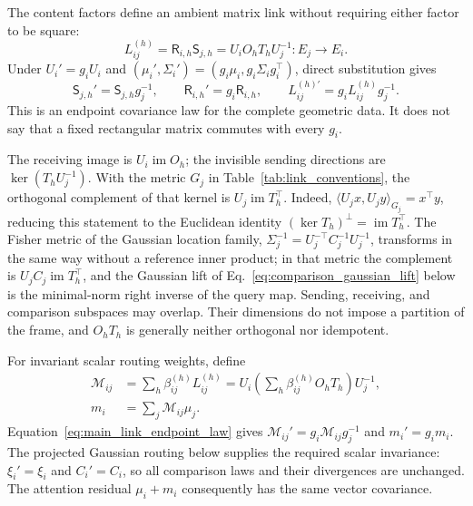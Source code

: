 \documentclass[twoside,11pt]{article}
\begin{document}
The content factors define an ambient matrix link without requiring either factor to be square:
\begin{equation}
L_{ij}^{(h)}=\mathsf R_{i,h}\mathsf S_{j,h}
=U_iO_hT_hU_j^{-1}:E_j\longrightarrow E_i.
\label{eq:main_content_link}
\end{equation}
Under $U_i'=g_iU_i$ and $(\mu_i',\Sigma_i')=(g_i\mu_i,g_i\Sigma_i g_i^\top)$, direct substitution gives
\begin{equation}
\mathsf S_{j,h}'=\mathsf S_{j,h}g_j^{-1},\qquad
\mathsf R_{i,h}'=g_i\mathsf R_{i,h},\qquad
L_{ij}^{(h)\prime}=g_iL_{ij}^{(h)}g_j^{-1}.
\label{eq:main_link_endpoint_law}
\end{equation}
This is an endpoint covariance law for the complete geometric data. It does not say that a fixed rectangular matrix commutes with every $g_i$.

The receiving image is $U_i\operatorname{im}O_h$; the invisible sending directions are $\ker(T_hU_j^{-1})$. With the metric $G_j$ in Table~\ref{tab:link_conventions}, the orthogonal complement of that kernel is $U_j\operatorname{im}T_h^\top$. Indeed, $\langle U_jx,U_jy\rangle_{G_j}=x^\top y$, reducing this statement to the Euclidean identity $(\ker T_h)^\perp=\operatorname{im}T_h^\top$. The Fisher metric of the Gaussian location family, $\Sigma_j^{-1}=U_j^{-\top}C_j^{-1}U_j^{-1}$, transforms in the same way without a reference inner product; in that metric the complement is $U_jC_j\operatorname{im}T_h^\top$, and the Gaussian lift of Eq.~\eqref{eq:comparison_gaussian_lift} below is the minimal-norm right inverse of the query map. Sending, receiving, and comparison subspaces may overlap. Their dimensions do not impose a partition of the frame, and $O_hT_h$ is generally neither orthogonal nor idempotent.

For invariant scalar routing weights, define
\begin{align}
\mathcal M_{ij}&=\sum_h\beta_{ij}^{(h)}L_{ij}^{(h)}
=U_i\left(\sum_h\beta_{ij}^{(h)}O_hT_h\right)U_j^{-1},\\
m_i&=\sum_j\mathcal M_{ij}\mu_j.
\label{eq:main_routed_link}
\end{align}
Equation~\eqref{eq:main_link_endpoint_law} gives $\mathcal M_{ij}'=g_i\mathcal M_{ij}g_j^{-1}$ and $m_i'=g_im_i$. The projected Gaussian routing below supplies the required scalar invariance: $\xi_i'=\xi_i$ and $C_i'=C_i$, so all comparison laws and their divergences are unchanged. The attention residual $\mu_i+m_i$ consequently has the same vector covariance.
\end{document}
